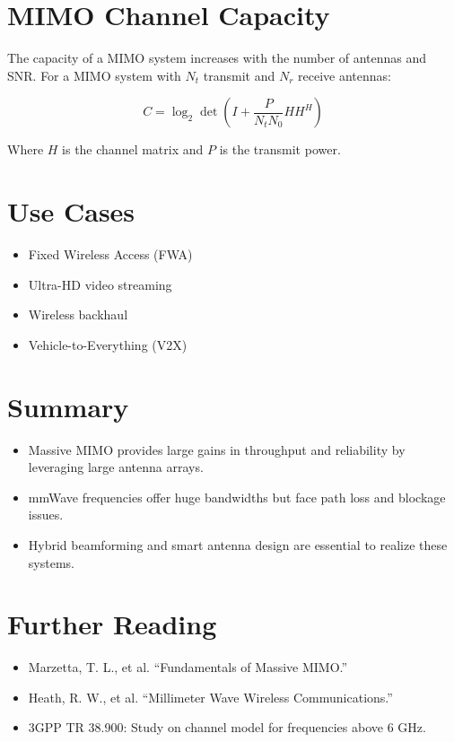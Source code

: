 \section{MIMO Channel Capacity}

The capacity of a MIMO system increases with the number of antennas and SNR. For a MIMO system with \( N_t \) transmit and \( N_r \) receive antennas:

\[
C = \log_2 \det \left( I + \frac{P}{N_t N_0} H H^H \right)
\]

Where \( H \) is the channel matrix and \( P \) is the transmit power.

\section{Use Cases}

\begin{itemize}
  \item Fixed Wireless Access (FWA)
  \item Ultra-HD video streaming
  \item Wireless backhaul
  \item Vehicle-to-Everything (V2X)
\end{itemize}

\section{Summary}

\begin{itemize}
  \item Massive MIMO provides large gains in throughput and reliability by leveraging large antenna arrays.
  \item mmWave frequencies offer huge bandwidths but face path loss and blockage issues.
  \item Hybrid beamforming and smart antenna design are essential to realize these systems.
\end{itemize}

\section{Further Reading}
\begin{itemize}
  \item Marzetta, T. L., et al. ``Fundamentals of Massive MIMO.''
  \item Heath, R. W., et al. ``Millimeter Wave Wireless Communications.''
  \item 3GPP TR 38.900: Study on channel model for frequencies above 6 GHz.
\end{itemize}



